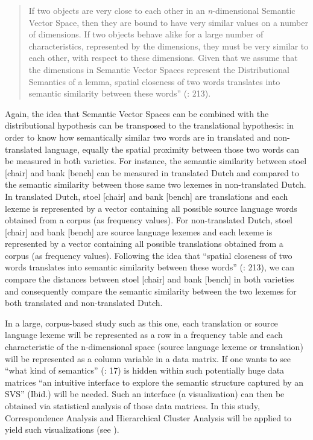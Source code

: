 \begin{quote}
If two objects are very close to each other in an \textit{n}{}-dimensional Semantic Vector Space, then they are bound to have very similar values on a number of dimensions. If two objects behave alike for a large number of characteristics, represented by the dimensions, they must be very similar to each other, with respect to these dimensions. Given that we assume that the dimensions in Semantic Vector Spaces represent the Distributional Semantics of a lemma, spatial closeness of two words translates into semantic similarity between these words” (\citealt{szmrecsanyi_semantic_2014}: 213).
\end{quote}


Again, the idea that Semantic Vector Spaces can be combined with the distributional hypothesis can be transposed to the translational hypothesis: in order to know how semantically similar two words are in translated and non-translated language, equally the spatial proximity between those two words can be measured in both varieties. For instance, the semantic similarity between stoel [chair] and bank [bench] can be measured in translated Dutch and compared to the semantic similarity between those same two lexemes in non-translated Dutch. In translated Dutch, stoel [chair] and bank [bench] are translations and each lexeme is represented by a vector containing all possible source language words obtained from a corpus (as frequency values). For non-translated Dutch, stoel [chair] and bank [bench] are source language lexemes and each lexeme is represented by a vector containing all possible translations obtained from a corpus (as frequency values). Following the idea that “spatial closeness of two words translates into semantic similarity between these words” (\citealt{szmrecsanyi_semantic_2014}: 213), we can compare the distances between stoel [chair] and bank [bench] in both varieties and consequently compare the semantic similarity between the two lexemes for both translated and non-translated Dutch. 



In a large, corpus-based study such as this one, each translation or source language lexeme will be represented as a row in a frequency table and each characteristic of the n-dimensional space (source language lexeme or translation) will be represented as a column variable in a data matrix. If one wants to see “what kind of semantics” (\citealt{heylen_looking_2012}: 17) is hidden within such potentially huge data matrices “an intuitive interface to explore the semantic structure captured by an SVS” (Ibid.) will be needed. Such an interface (a visualization) can then be obtained via statistical analysis of those data matrices. In this study, Correspondence Analysis and Hierarchical Cluster Analysis will be applied to yield such visualizations (see ).


